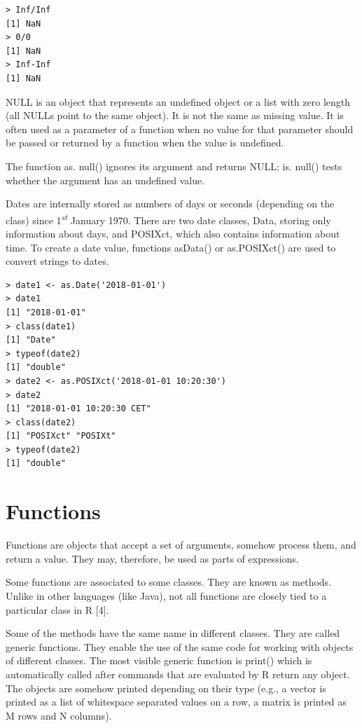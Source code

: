 \documentclass[11pt,openany,executivepaper]{book}
\begin{document}
\begin{verbatim}
> Inf/Inf
[1] NaN
> 0/0
[1] NaN
> Inf-Inf
[1] NaN
\end{verbatim}

NULL is an object that represents an undefined object or a list with zero length (all NULLs point to the same object). It is not the same as missing value. It is often used as a parameter of a function when no value for that parameter should be passed or returned by a function when the value is undefined.

The function as. null() ignores its argument and returns NULL; is. null() tests whether the argument has an undefined value.

Dates are internally stored as numbers of days or seconds (depending on the class) since 1\textsuperscript{\textit{st}} January 1970. There are two date classes, Data, storing only information about days, and POSIXct, which also contains information about time. To create a date value, functions asData() or as.POSIXct() are used to convert strings to dates.

\begin{verbatim}
> date1 <- as.Date('2018-01-01')
> date1
[1] "2018-01-01"
> class(date1)
[1] "Date"
> typeof(date2)
[1] "double"
> date2 <- as.POSIXct('2018-01-01 10:20:30')
> date2
[1] "2018-01-01 10:20:30 CET"
> class(date2)
[1] "POSIXct" "POSIXt"
> typeof(date2)
[1] "double"
\end{verbatim}

\section{Functions}
Functions are objects that accept a set of arguments, somehow process them, and return a value. They may, therefore, be used as parts of expressions.

Some functions are associated to some classes. They are known as methods. Unlike in other languages (like Java), not all functions are closely tied to a particular class in R [4].

Some of the methods have the same name in different classes. They are called generic functions. They enable the use of the same code for working with objects of different classes. The most visible generic function is print() which is automatically called after commands that are evaluated by R return any object. The objects are somehow printed depending on their type (e.g., a vector is printed as a list of whitespace separated values on a row, a matrix is printed as M rows and N columns).
\end{document}
